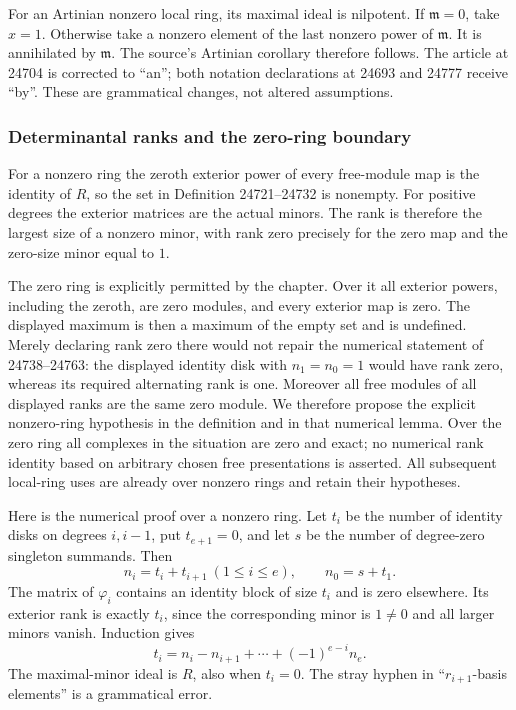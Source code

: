 For an Artinian nonzero local ring, its maximal ideal is nilpotent. If \(\mathfrak m=0\), take \(x=1\). Otherwise take a nonzero element of the last nonzero power of \(\mathfrak m\). It is annihilated by \(\mathfrak m\). The source's Artinian corollary therefore follows. The article at 24704 is corrected to ``an''; both notation declarations at 24693 and 24777 receive ``by''. These are grammatical changes, not altered assumptions.

\subsubsection{Determinantal ranks and the zero-ring boundary}\label{determinantal-ranks-and-the-zero-ring-boundary}

For a nonzero ring the zeroth exterior power of every free-module map is the identity of \(R\), so the set in Definition 24721--24732 is nonempty. For positive degrees the exterior matrices are the actual minors. The rank is therefore the largest size of a nonzero minor, with rank zero precisely for the zero map and the zero-size minor equal to \(1\).

The zero ring is explicitly permitted by the chapter. Over it all exterior powers, including the zeroth, are zero modules, and every exterior map is zero. The displayed maximum is then a maximum of the empty set and is undefined. Merely declaring rank zero there would not repair the numerical statement of 24738--24763: the displayed identity disk with \(n_1=n_0=1\) would have rank zero, whereas its required alternating rank is one. Moreover all free modules of all displayed ranks are the same zero module. We therefore propose the explicit nonzero-ring hypothesis in the definition and in that numerical lemma. Over the zero ring all complexes in the situation are zero and exact; no numerical rank identity based on arbitrary chosen free presentations is asserted. All subsequent local-ring uses are already over nonzero rings and retain their hypotheses.

Here is the numerical proof over a nonzero ring. Let \(t_i\) be the number of identity disks on degrees \(i,i-1\), put \(t_{e+1}=0\), and let \(s\) be the number of degree-zero singleton summands. Then \[
 n_i=t_i+t_{i+1}\ (1\le i\le e),\qquad n_0=s+t_1.
\] The matrix of \(\varphi_i\) contains an identity block of size \(t_i\) and is zero elsewhere. Its exterior rank is exactly \(t_i\), since the corresponding minor is \(1\ne0\) and all larger minors vanish. Induction gives \[
 t_i=n_i-n_{i+1}+\cdots+(-1)^{e-i}n_e .
\] The maximal-minor ideal is \(R\), also when \(t_i=0\). The stray hyphen in ``\(r_{i+1}\)-basis elements'' is a grammatical error.

